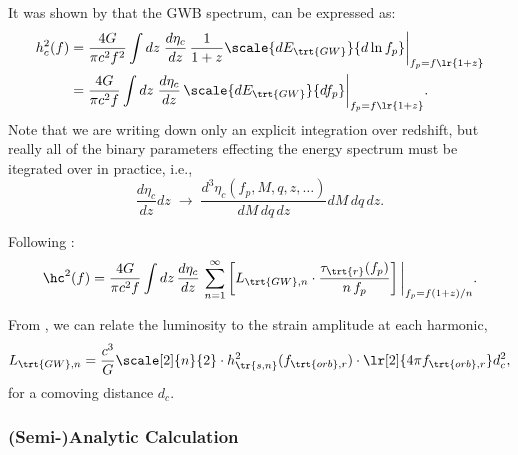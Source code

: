 \documentclass[10pt, oneside, onecolumn]{article}   	%
\newcommand{\hsn}{h_\tr{s,n}}
\newcommand{\frstorb}{f_{\trt{orb},r}}
\newcommand{\lgwn}{L_{\trt{GW},n}}
\newcommand{\thard}{\tau_\trt{r}}
\newcommand{\ndens}{\eta_c}
\begin{document}
            It was shown by \citet[][Eq.5]{Phinney-2001} that the GWB spectrum, can be expressed as:
            \begin{subequations}
            \begin{align}
                h_c^2(f)
                & = \frac{4G}{\pi c^2 f^2} \int dz \; \frac{d\ndens}{dz} \, \frac{1}{1+z} \scale{dE_\trt{GW}}{d \ln f_p} \bigg|_{f_p=f\lr{1+z}} \\
                & = \frac{4G}{\pi c^2 f} \int dz \; \frac{d\ndens}{dz} \, \scale{dE_\trt{GW}}{d f_p} \bigg|_{f_p=f\lr{1+z}}.
            \end{align}
            \end{subequations}
            Note that we are writing down only an explicit integration over redshift, but really all of the binary parameters effecting the energy spectrum must be itegrated over in practice, i.e.,
            \begin{equation}
                \label{eq:implicit_bins}
                \frac{d\ndens}{dz} dz \; \rightarrow \; \frac{d^3\ndens(f_p, M, q, z, \dots)}{dM \, dq \, dz} dM \, dq \, dz.
            \end{equation}

            Following \citet[][Eq.~3.5/10/11; or Eq.~\ref{eq:gw_energy_spectrum}~\&~\ref{eq:lum_gw} above]{enoki2007a}:
            \begin{equation}
                \label{eq:strain_spectrum_en07}
                \hc^2(f) = \frac{4G}{\pi c^2 f} \int dz \, \frac{d\ndens}{dz} \,
                    \sum_{n=1}^\infty \left[ \lgwn \cdot \frac{\thard(f_p)}{n \, f_p} \right] \bigg|_{f_p = f(1+z)/n}.
            \end{equation}

            From \citet[][Eq.~2.1]{Finn+Thorne-2000}, we can relate the luminosity to the strain amplitude at each harmonic,
            \begin{equation}
                \label{eq:lum_to_strain}
                \lgwn = \frac{c^3}{G} \scale[2]{n}{2} \cdot \hsn^2(\frstorb) \cdot \lr[2]{4\pi \frstorb} d_c^2,
            \end{equation}
            for a comoving distance $d_c$.

            \subsubsection{(Semi-)Analytic Calculation}
\end{document}
